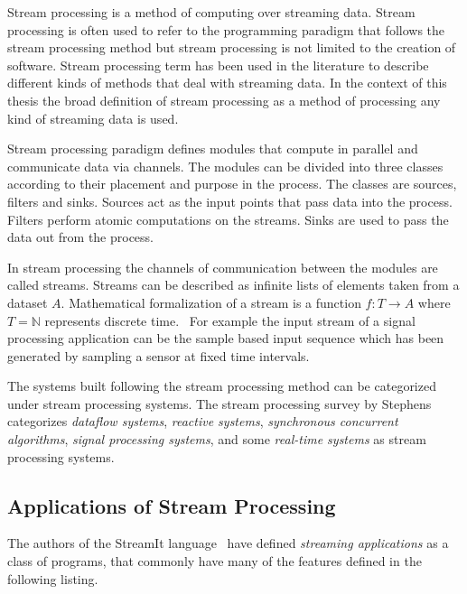 Stream processing is a method of computing over streaming data. Stream processing is often used to refer to the programming paradigm that follows the stream processing method but stream processing is not limited to the creation of software. Stream processing term has been used in the literature to describe different kinds of methods that deal with streaming data. In the context of this thesis the broad definition of stream processing as a method of processing any kind of streaming data is used. 

Stream processing paradigm defines modules that compute in parallel and communicate data via channels. The modules can be divided into three classes according to their placement and purpose in the process. The classes are sources, filters and sinks. Sources act as the input points that pass data into the process. Filters perform atomic computations on the streams. Sinks are used to pass the data out from the process.~\cite{stephens1997survey}

In stream processing the channels of communication between the modules are called streams. Streams can be described as infinite lists of elements taken from a dataset $A$. Mathematical formalization of a stream is a function $f:T \rightarrow A$ where $T = \mathbb{N}$ represents discrete time.~\cite{stephens1997survey} For example the input stream of a signal processing application can be the sample based input sequence which has been generated by sampling a sensor at fixed time intervals.

The systems built following the stream processing method can be categorized under stream processing systems. The stream processing survey by Stephens \cite{stephens1997survey} categorizes \textit{dataflow systems}, \textit{reactive systems}, \textit{synchronous concurrent algorithms}, \textit{signal processing systems}, and some \textit{real-time systems} as stream processing systems. 

\subsection{Applications of Stream Processing}
\label{subsec:streaming-applications}
The authors of the StreamIt language~\cite{thies2002streamit} have defined \textit{streaming applications} as a class of programs, that commonly have many of the features defined in the following listing.

